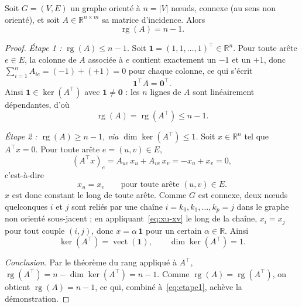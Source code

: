 \documentclass[11pt]{ama-article}
\begin{document}
\begin{theoreme}
Soit $G=(V,E)$ un graphe orienté à $n=|V|$ nœuds, connexe (au sens non orienté), et soit
$A\in\mathbb{R}^{n\times m}$ sa matrice d'incidence. Alors
\begin{equation}
\operatorname{rg}(A) = n-1.
\label{eq:rang-theoreme}
\end{equation}
\end{theoreme}

\begin{proof}
\textit{Étape 1 : $\operatorname{rg}(A)\le n-1$.} Soit
$\mathbf{1}=(1,1,\dots,1)^\top\in\mathbb{R}^n$. Pour toute arête $e\in E$, la colonne de $A$
associée à $e$ contient exactement un $-1$ et un $+1$, donc
$\sum_{i=1}^n A_{ie} = (-1)+(+1)=0$ pour chaque colonne, ce qui s'écrit
\begin{equation}
\mathbf{1}^\top A = \mathbf{0}^\top.
\label{eq:1TA}
\end{equation}
Ainsi $\mathbf{1}\in\ker(A^\top)$ avec $\mathbf{1}\ne\mathbf{0}$ : les $n$ lignes de $A$ sont
linéairement dépendantes, d'où
\begin{equation}
\operatorname{rg}(A) = \operatorname{rg}(A^\top) \le n-1.
\label{eq:etape1}
\end{equation}

\textit{Étape 2 : $\operatorname{rg}(A)\ge n-1$, via $\dim\ker(A^\top)\le 1$.} Soit
$x\in\mathbb{R}^n$ tel que $A^\top x=0$. Pour toute arête $e=(u,v)\in E$,
\[
(A^\top x)_e = A_{ue}\,x_u + A_{ve}\,x_v = -x_u + x_v = 0,
\]
c'est-à-dire
\begin{equation}
x_u = x_v \qquad \text{pour toute arête } (u,v)\in E.
\label{eq:xu-xv}
\end{equation}
$x$ est donc constant le long de toute arête. Comme $G$ est connexe, deux nœuds quelconques $i$
et $j$ sont reliés par une chaîne $i=k_0,k_1,\dots,k_p=j$ dans le graphe non orienté
sous-jacent ; en appliquant~\eqref{eq:xu-xv} le long de la chaîne, $x_i=x_j$ pour tout couple
$(i,j)$, donc $x=\alpha\,\mathbf{1}$ pour un certain $\alpha\in\mathbb{R}$. Ainsi
\begin{equation}
\ker(A^\top) = \operatorname{vect}(\mathbf{1}), \qquad \dim\ker(A^\top)=1.
\label{eq:dim-ker-AT}
\end{equation}

\textit{Conclusion.} Par le théorème du rang appliqué à $A^\top$,
$\operatorname{rg}(A^\top) = n-\dim\ker(A^\top) = n-1$. Comme
$\operatorname{rg}(A)=\operatorname{rg}(A^\top)$, on obtient $\operatorname{rg}(A)=n-1$, ce qui,
combiné à~\eqref{eq:etape1}, achève la démonstration.
\end{proof}
\end{document}
